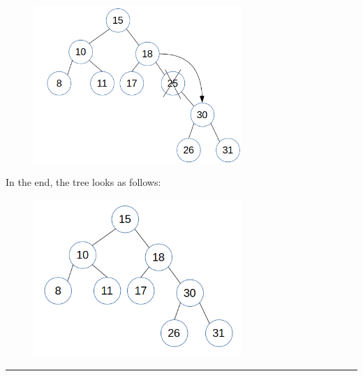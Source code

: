 \documentclass{article}
\begin{document}
\begin{enumerate}
\begin{figure}[H]
	\includegraphics[width=0.7\textwidth]{P11/25}
\end{figure}

In the end, the tree looks as follows:

\begin{figure}[H]
	\includegraphics[width=0.7\textwidth]{P11/final}
\end{figure}
\noindent\rule{8cm}{0.4pt}


\end{enumerate}
\end{document}
